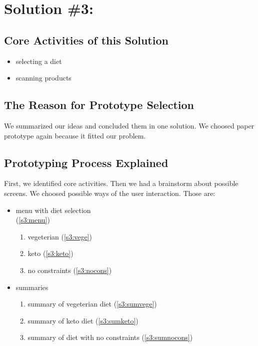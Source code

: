 \section{Solution \#3:}

\subsection{Core Activities of this Solution}

\begin{itemize}
	\item selecting a diet
	
	\item scanning products
\end{itemize}

\subsection{The Reason for Prototype Selection}

We summarized our ideas and concluded them in one solution. We choosed paper prototype again because it fitted our problem.

\subsection{Prototyping Process Explained}

First, we identified core activities. Then we had a brainstorm about possible screens. We choosed possible ways of the user interaction. Those are:
\begin{itemize}
	\item menu with diet selection\\
	(\autoref{s3:menu})
	
	\begin{enumerate}
		\item vegeterian
     	(\autoref{s3:vege})
    	\item keto
    	(\autoref{s3:keto})
    	\item no constraints
    	(\autoref{s3:nocons})
	\end{enumerate}
   	
   	\item summaries
   	\begin{enumerate}
		\item summary of vegeterian diet
     	(\autoref{s3:sumvege})
    	\item summary of keto diet
    	(\autoref{s3:sumketo})
    	\item summary of diet with no constraints
    	(\autoref{s3:sumnocons})
	\end{enumerate}
	
\end{itemize}

